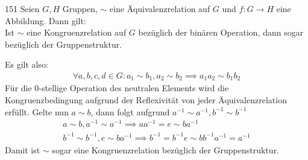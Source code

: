 \begin{algebraUE}{151}
Seien $G,H$ Gruppen, $\sim$ eine Äquivalenzrelation auf $G$ und $f: G \rightarrow H$
eine Abbildung. Dann gilt: \\
Ist $\sim$ eine Kongruenzrelation auf $G$ bezüglich der binären Operation, dann
sogar bezüglich der Gruppenstruktur.
\end{algebraUE}
\begin{solution}
Es gilt also:
\begin{align*}
  \forall a,b,c,d \in G: a_1 \sim b_1, a_2 \sim b_2 \implies a_1a_2 \sim b_1b_2
\end{align*}
Für die 0-stellige Operation des neutralen Elements wird die Kongruenzbedingung
aufgrund der Reflexivität von jeder Äquivalenzrelation erfüllt.
Gelte nun $a \sim b$, dann folgt aufgrund $a^{-1} \sim a^{-1}, b^{-1} \sim b^{-1}$
\begin{align*}
  a \sim b, a^{-1} \sim a^{-1} \implies aa^{-1} = e \sim ba^{-1} \\
  b^{-1} \sim b^{-1}, e \sim ba^{-1} \implies b^{-1} =  b^{-1}e \sim bb^{-1}a^{-1} = a^{-1}
\end{align*}
Damit ist $\sim$ sogar eine Kongruenzrelation bezüglich der Gruppenstruktur.
\end{solution}

